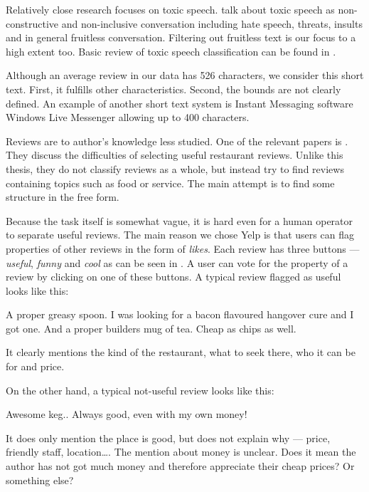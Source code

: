 Relatively close research focuses on toxic speech.
\citet{van2018challenges} talk about toxic speech as non-constructive and non-inclusive conversation including hate speech, threats, insults and in general fruitless conversation.
Filtering out fruitless text is our focus to a high extent too.
Basic review of toxic speech classification can be found in \citet{gunasekara2018review}.

Although an average review in our data has 526 characters, we consider this short text.
First, it fulfills other characteristics.
Second, the bounds are not clearly defined.
An example of another short text system is Instant Messaging software Windows Live Messenger allowing up to 400 characters.

Reviews are to author's knowledge less studied.
One of the relevant papers is \citet{ganu2009beyond}.
They discuss the difficulties of selecting useful restaurant reviews.
Unlike this thesis, they do not classify reviews as a whole, but instead try to find reviews containing topics such as food or service.
The main attempt is to find some structure in the free form.


Because the task itself is somewhat vague, it is hard even for a human operator to separate
useful reviews.
The main reason we chose Yelp is that users can flag properties of other reviews in the form of \emph{likes}.
Each review has three buttons --- \emph{useful}, \emph{funny} and \emph{cool} as can be seen in .
A user can vote for the property of a review by clicking on one of these buttons.
A typical review flagged as useful looks like this:

\begin{code}
A proper greasy spoon.
I was looking for a bacon flavoured hangover cure and I got one.
And a proper builders mug of tea.
Cheap as chips as well.
\end{code}

It clearly mentions the kind of the restaurant, what to seek there,
who it can be for and price.

On the other hand, a typical not-useful review looks like this:

\begin{code}
Awesome keg.. Always good, even with my own money!
\end{code}

It does only mention the place is good, but does not explain why --- price, friendly staff, location\dots.
The mention about money is unclear.
Does it mean the author has not got much money and therefore appreciate their cheap prices? Or something else?

